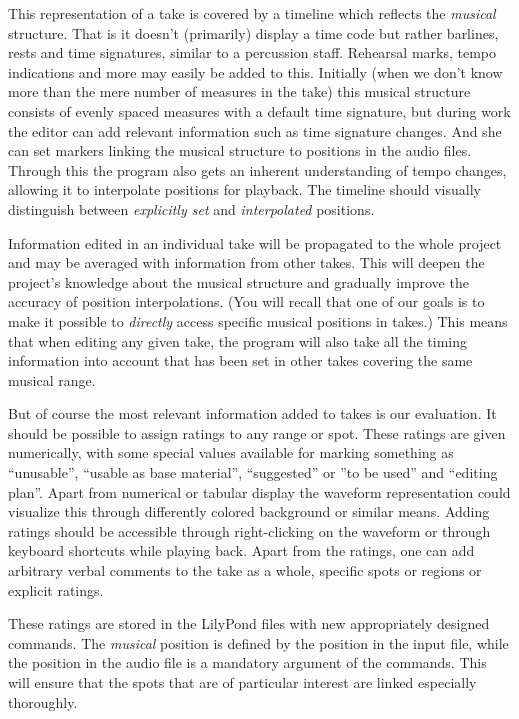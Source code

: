 \documentclass[11pt,a4paper]{article}
\begin{document}
This representation of a take is covered by a timeline which reflects the
\emph{musical} structure.
That is it doesn't (primarily) display a time code but rather barlines, rests
and time signatures, similar to a percussion staff.
Rehearsal marks, tempo indications and more may easily be added to this.
Initially (when we don't know more than the mere number of measures in the take)
this musical structure consists of evenly spaced measures with a default time
signature, but during work the editor can add relevant information such as time
signature changes.
And she can set markers linking the musical structure to positions in the audio
files.
Through this the program also gets an inherent understanding of tempo changes,
allowing it to interpolate positions for playback.
The timeline should visually distinguish between \emph{explicitly set} and
\emph{interpolated} positions.

Information edited in an individual take will be propagated to the whole project
and may be averaged with information from other takes.
This will deepen the project's knowledge about the musical structure and
gradually improve the accuracy of position interpolations.
(You will recall that one of our goals is to make it possible to \emph{directly}
access specific musical positions in takes.)
This means that when editing any given take, the program will also take all the
timing information into account that has been set in other takes covering the
same musical range.

But of course the most relevant information added to takes is our evaluation.
It should be possible to assign ratings to any range or spot.
These ratings are given numerically, with some special values available for
marking something as “unusable”, “usable as base material”, “suggested” or ”to
be used” and “editing plan”.
Apart from numerical or tabular display the waveform representation could
visualize this through differently colored background or similar means.
Adding ratings should be accessible through right-clicking on the waveform or
through keyboard shortcuts while playing back.
Apart from the ratings, one can add arbitrary verbal comments to the take as a
whole, specific spots or regions or explicit ratings.

These ratings are stored in the LilyPond files with new appropriately designed
commands.
The \emph{musical} position is defined by the position in the input file, while
the position in the audio file is a mandatory argument of the commands.
This will ensure that the spots that are of particular interest are linked
especially thoroughly.
\end{document}
